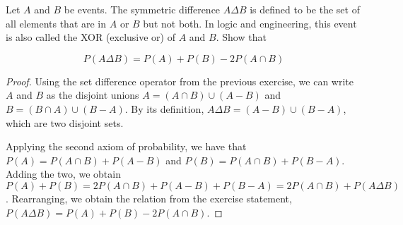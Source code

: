 \begin{exercise}{45}
Let $A$ and $B$ be events. The symmetric difference $A \Delta B$ is defined to be the set of all
elements that are in $A$  or $B$ but not both. In logic and engineering, this event is also
called the XOR (exclusive or) of $A$ and $B$. Show that

$$P(A \Delta B) = P(A) + P(B) - 2P(A \cap B)$$


\end{exercise}


\begin{proof}
Using the set difference operator from the previous exercise, we can write $A$ and $B$ as the disjoint unions $A = (A \cap B) \cup (A - B)$ and $B = (B \cap A) \cup (B-A)$. By its definition, $A \Delta B = (A-B) \cup (B-A)$, which are two disjoint sets.

Applying the second axiom of probability, we have that $P(A) = P(A \cap B) + P(A - B)$ and $P(B) = P(A \cap B) + P(B - A)$. Adding the two, we obtain $P(A) + P(B) = 2P(A \cap B) + P(A - B) + P(B - A) = 2P(A \cap B) + P(A \Delta B)$. Rearranging, we obtain the relation from the exercise statement, $P(A \Delta B) = P(A) + P(B) - 2P(A \cap B)$.
\end{proof}

